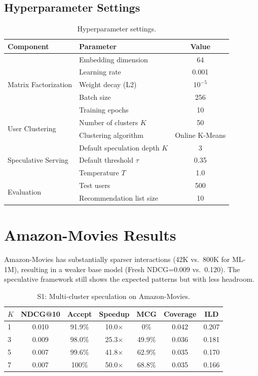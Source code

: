 \documentclass{article}
\begin{document}
\subsection{Hyperparameter Settings}
\label{app:hyperparams}

\begin{table}[h]
\centering
\caption{Hyperparameter settings.}
\label{tab:hyperparams}
\small
\begin{tabular}{llc}
\toprule
\textbf{Component} & \textbf{Parameter} & \textbf{Value} \\
\midrule
\multirow{5}{*}{Matrix Factorization}
& Embedding dimension & 64 \\
& Learning rate & 0.001 \\
& Weight decay (L2) & $10^{-5}$ \\
& Batch size & 256 \\
& Training epochs & 10 \\
\midrule
\multirow{2}{*}{User Clustering}
& Number of clusters $K$ & 50 \\
& Clustering algorithm & Online K-Means \\
\midrule
\multirow{3}{*}{Speculative Serving}
& Default speculation depth $K$ & 3 \\
& Default threshold $\tau$ & 0.35 \\
& Temperature $T$ & 1.0 \\
\midrule
\multirow{2}{*}{Evaluation}
& Test users & 500 \\
& Recommendation list size & 10 \\
\bottomrule
\end{tabular}
\end{table}

\section{Amazon-Movies Results}
\label{app:amazon}

Amazon-Movies has substantially sparser interactions (42K vs.\ 800K for ML-1M), resulting in a weaker base model (Fresh NDCG=0.009 vs.\ 0.120). The speculative framework still shows the expected patterns but with less headroom.

\begin{table}[h]
\centering
\caption{S1: Multi-cluster speculation on Amazon-Movies.}
\label{tab:s1_amazon}
\small
\begin{tabular}{lcccccc}
\toprule
$K$ & NDCG@10 & Accept & Speedup & MCG & Coverage & ILD \\
\midrule
1 & 0.010 & 91.9\% & 10.0$\times$ & 0\% & 0.042 & 0.207 \\
3 & 0.009 & 98.0\% & 25.3$\times$ & 49.9\% & 0.036 & 0.181 \\
5 & 0.007 & 99.6\% & 41.8$\times$ & 62.9\% & 0.035 & 0.170 \\
7 & 0.007 & 100\% & 50.0$\times$ & 68.8\% & 0.035 & 0.166 \\
\bottomrule
\end{tabular}
\end{table}
\end{document}
